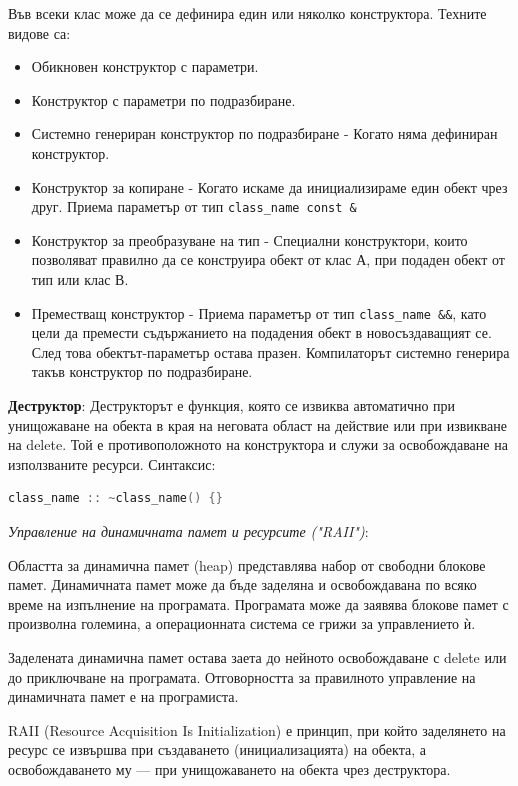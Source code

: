 \documentclass{article}
\renewcommand{\\}{\newline}
\begin{document}
Във всеки клас може да се дефинира един или няколко конструктора. Техните видове са:
\begin{itemize}
    \item Обикновен конструктор с параметри.
    \item Конструктор с параметри по подразбиране.
    \item Системно генериран конструктор по подразбиране - Когато няма дефиниран конструктор.
    \item Конструктор за копиране - Когато искаме да инициализираме един обект чрез друг. Приема параметър от тип \texttt{class\_name const \&}
    \item Конструктор за преобразуване на тип - Специални конструктори, които позволяват правилно да се конструира обект от клас А, при подаден обект от тип  или клас В.
    \item Преместващ конструктор - Приема параметър от тип \texttt{class\_name \&\&}, като цели да премести съдържанието на подадения обект в новосъздаващият се. След това обектът-параметър остава празен. Компилаторът системно генерира такъв конструктор по подразбиране.
\end{itemize}

\textbf{Деструктор}: Деструкторът е функция, която се извиква автоматично при унищожаване на обекта в края на неговата област на действие или при извикване на delete. Той е противоположното на конструктора и служи за освобождаване на използваните ресурси. Синтаксис:
\begin{lstlisting}[language=C++]
    class_name :: ~class_name() {}
\end{lstlisting}

\textit{Управление на динамичната памет и ресурсите ("RAII")}:

Областта за динамична памет (heap) представлява набор от свободни блокове памет. Динамичната памет може да бъде заделяна и освобождавана по всяко време на изпълнение на програмата. Програмата може да заявява блокове памет с произволна големина, а операционната система се грижи за управлението ѝ.

Заделената динамична памет остава заета до нейното освобождаване с delete или до приключване на програмата. Отговорността за правилното управление на динамичната памет е на програмиста.

RAII (Resource Acquisition Is Initialization) е принцип, при който заделянето на ресурс се извършва при създаването (инициализацията) на обекта, а освобождаването му — при унищожаването на обекта чрез деструктора.
\end{document}

